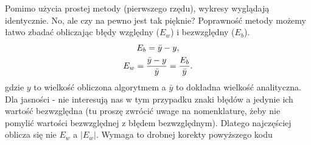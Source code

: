 \documentclass[a4paper,12pt,polish]{sphinxmanual}
\begin{document}
Pomimo użycia prostej metody (pierwszego rzędu), wykresy wyglądają identycznie. No, ale czy na pewno jest tak pięknie?
Poprawność metody możemy łatwo zbadać obliczając błędy względny ($E_w$) i bezwzględny ($E_b$).
\begin{gather}
\begin{split}E_b = \bar{y} - y,\end{split}\notag\\\begin{split}E_w = \frac{\bar{y} - y}{\bar{y}} = \frac{E_b}{\bar{y}}.\end{split}\notag
\end{gather}
gdzie $y$ to wielkość obliczona algorytmem a $\bar{y}$ to dokładna wielkość analityczna. Dla jasności -
nie interesują nas w tym przypadku znaki błędów a jedynie ich wartość bezwzględna (tu proszę zwrócić
uwage na nomenklaturę, żeby nie pomylić wartości bezwzględnej z błędem bezwzględnym). Dlatego najczęściej
oblicza się nie $E_w$ a $|E_w|$. Wymaga to drobnej korekty powyższego kodu
\end{document}
